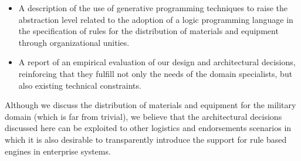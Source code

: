 \begin{itemize}
\item A description of the use of generative programming techniques to raise the abstraction level 
 related to the adoption of a logic programming language in the specification of rules for the 
 distribution of materials and equipment through organizational unities.

\item A report of an empirical evaluation of our design and architectural decisions, reinforcing that they fulfill 
 not only the needs of the domain specialists, but also existing technical constraints. 

\end{itemize} 


Although we discuss the distribution of materials and equipment for the military domain (which is far from trivial), we believe that the architectural decisions discussed here can be exploited to other logistics and endorsements scenarios in which it is also desirable to transparently introduce the support for rule based engines in enterprise systems.


